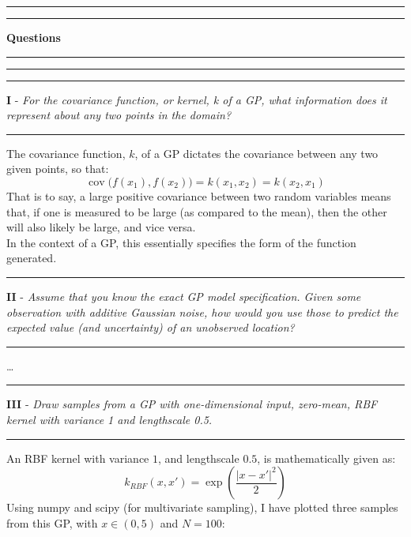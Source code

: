 \documentclass[12pt]{article}
\newcommand{\doubleline}{
    \hrule
    \vspace*{0.05cm}
    \hrule
    \vspace*{0.25cm}
}
\DeclareMathOperator{\cov}{cov}
\begin{document}
    \newpage
    \doubleline
    \begin{center}
        \huge \textbf{Questions}
    \end{center}
    \doubleline
    \begin{center}
        \hrule\vspace*{0.25cm}
        \textbf{I} - \textit{For the covariance function, or kernel, k of a GP, what information does it represent about any two points in the domain?}\vspace*{0.25cm}\hrule
    \end{center}
    The covariance function, $k$, of a GP dictates the covariance between any two given points, so that:
    \begin{equation*}
        \cov\big(f(x_1),f(x_2)\big) = k(x_1,x_2) = k(x_2,x_1)
    \end{equation*}
    That is to say, a large positive covariance between two random variables means that, if one is measured to be large (as compared to the mean), then the other will also likely be large, and vice versa.\\
    In the context of a GP, this essentially specifies the form of the function generated.
    \begin{center}
        \hrule\vspace*{0.25cm}
        \textbf{II} - \textit{Assume that you know the exact GP model specification. Given some observation with additive Gaussian noise, how would you use those to predict the expected value (and uncertainty) of an unobserved location?}\vspace*{0.25cm}\hrule
    \end{center}
    \dots
    \begin{center}
        \hrule\vspace*{0.25cm}
        \textbf{III} - \textit{Draw samples from a GP with one-dimensional input, zero-mean, RBF kernel with variance 1 and lengthscale 0.5.}\vspace*{0.25cm}\hrule
    \end{center}
    An RBF kernel with variance $1$, and lengthscale $0.5$, is mathematically given as:
    \begin{equation*}
        k_{RBF}(x,x') = \exp\left(\frac{\left| x-x'\right|^2}{2}\right)
    \end{equation*}
    Using numpy and scipy (for multivariate sampling), I have plotted three samples from this GP, with $x\in (0,5)$ and $N=100$:
\end{document}
